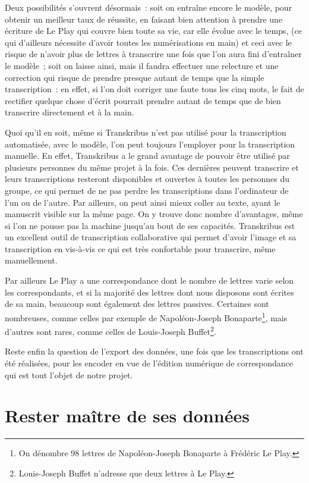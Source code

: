 Deux possibilités s’ouvrent désormais : soit on entraîne encore le modèle, pour obtenir un meilleur taux de réussite, en faisant bien attention à prendre une écriture de Le Play qui couvre bien toute sa vie, car elle évolue avec le temps, (ce qui d’ailleurs nécessite d’avoir toutes les numérisations en main) et ceci avec le risque de n’avoir plus de lettres à transcrire une fois que l’on aura fini d’entraîner le modèle ; soit on laisse ainsi, mais il faudra effectuer une relecture et une correction qui risque de prendre presque autant de temps que la simple transcription : en effet, si l’on doit corriger une faute tous les cinq mots, le fait de rectifier quelque chose d’écrit pourrait prendre autant de temps que de bien transcrire directement et à la main. 

Quoi qu’il en soit, même si Transkribus n’est pas utilisé pour la transcription automatisée, avec le modèle, l’on peut toujours l’employer pour la transcription manuelle. En effet, Transkribus a le grand avantage de pouvoir être utilisé par plusieurs personnes du même projet à la fois. Ces dernières peuvent transcrire et leurs transcriptions resteront disponibles et ouvertes à toutes les personnes du groupe, ce qui permet de ne pas perdre les transcriptions dans l’ordinateur de l’un ou de l’autre. Par ailleurs, on peut ainsi mieux coller au texte, ayant le manuscrit visible sur la même page. On y trouve donc nombre d’avantages, même si l’on ne pousse pas la machine jusqu’au bout de ses capacités. Transkribus est un excellent outil de transcription collaborative qui permet d'avoir l'image et sa transcription en vis-à-vis ce qui est très confortable pour transcrire, même manuellement. 

Par ailleurs Le Play a une correspondance dont le nombre de lettres varie selon les correspondants, et si la majorité des lettres dont nous disposons sont écrites de sa main, beaucoup sont également des lettres passives. Certaines sont nombreuses, comme celles par exemple de Napoléon-Joseph Bonaparte\footnote{On dénombre 98 lettres de Napoléon-Joseph Bonaparte à Frédéric Le Play.}, mais d’autres sont rares, comme celles de Louis-Joseph Buffet\footnote{Louis-Joseph Buffet n’adresse que deux lettres à Le Play. }. 

Reste enfin la question de l’export des données, une fois que les transcriptions ont été réalisées, pour les encoder en vue de l’édition numérique de correspondance qui est tout l’objet de notre projet.


\section{Rester maître de ses données}


